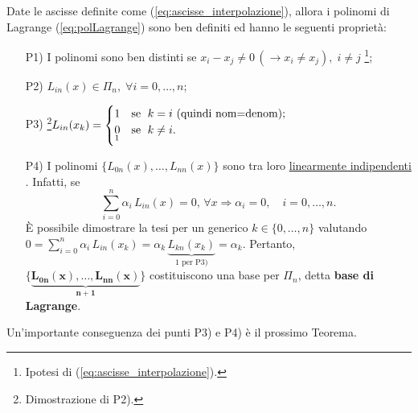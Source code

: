 \begin{property}
	Date le ascisse definite come (\ref{eq:ascisse_interpolazione}), allora i polinomi di Lagrange (\ref{eq:polLagrange}) sono ben definiti ed hanno le seguenti proprietà:
	\begin{itemize}
		\item[P1)] I polinomi sono ben distinti se $x_i-x_j\neq 0\,(\rightarrow x_i\neq x_j),\; i\neq j$ \footnote{Ipotesi di (\ref{eq:ascisse_interpolazione}).};
		\item [P2)]\footnotemark $L_{in}(x)\in\Pi_n,\; \forall i=0,\hdots,n$;
		\item[P3)]\footnote{Dimostrazione di P2).}$L_{in}(x_k)=
		\begin{cases}
			1 & \text{se $\;k=i$ (quindi nom=denom);}\\
			\underset{\footnotemark}{0} & \text{se $\;k\neq i$.}
		\end{cases}$
		\item[P4)] I polinomi $\{L_{0n}(x), \hdots, L_{nn}(x)\}$ sono tra loro \uline{linearmente indipendenti} \footnotemark.
		Infatti, se
		\begin{equation*}
			\sum_{i=0}^n \alpha_i\, L_{in}(x)=0, \, \forall x \Longrightarrow \alpha_i=0,\quad i=0,\hdots,n.
		\end{equation*}
		È possibile dimostrare la tesi per un generico $k\in \{0,\hdots,n\}$ valutando $0=\sum_{i=0}^n \alpha_i\, L_{in}(x_k)=\alpha_k\,\underbrace{L_{kn}(x_k)}_{1 \text{ per P3)}}=\alpha_k.$ Pertanto, $\boldsymbol{\{\underbrace{L_{0n}(x), \hdots,L_{nn}(x)}_{n+1}\}}$ costituiscono una base per $\Pi_n$, detta \textbf{base di Lagrange}.
	\end{itemize}
\end{property}

Un'importante conseguenza dei punti P3) e P4) è il prossimo Teorema.

